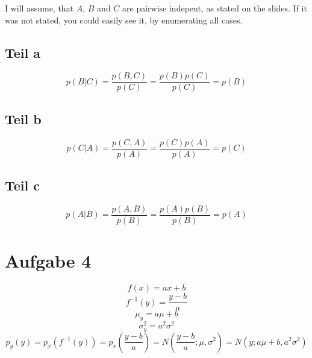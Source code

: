 \documentclass[10pt,a4paper]{article}
\begin{document}
I will assume, that $A$, $B$ and $C$ are pairwise indepent, as stated on the
slides. If it was not stated, you could easily see it, by enumerating all cases.

\subsection{Teil a}

\begin{equation}
  p(B | C) = \frac{p(B, C)}{p(C)} = \frac{p(B)p(C)}{p(C)} = p(B)
\end{equation}

\subsection{Teil b}

\begin{equation}
  p(C | A) = \frac{p(C, A)}{p(A)} = \frac{p(C)p(A)}{p(A)} = p(C)
\end{equation}

\subsection{Teil c}

\begin{equation}
  p(A | B) = \frac{p(A, B)}{p(B)} = \frac{p(A)p(B)}{p(B)} = p(A)
\end{equation}

\section{Aufgabe 4}

\begin{equation}
  f(x) = ax + b
\end{equation}
\begin{equation}
  f^{-1}(y) = \frac{y - b}{a}
\end{equation}
\begin{equation}
  \mu_{y} = a\mu + b
\end{equation}
\begin{equation}
  \sigma_{y}^{2} = a^{2}\sigma^{2}
\end{equation}
\begin{equation}
  p_{y}(y) = p_{x}(f^{-1}(y)) = p_{x}\left( \frac{y - b}{a} \right) = N\left( \frac{y - b}{a}; \mu, \sigma^{2} \right) = N(y; a\mu + b, a^{2}\sigma^{2})
\end{equation}
\end{document}
